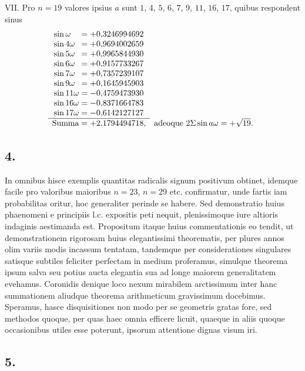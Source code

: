 \documentclass[twoside,12pt, showframe]{memoir}
\begin{document}
VII. Pro \(n=19\) valores ipsius \(a\) sunt \(1\), \(4\), \(5\), \(6\), \(7\), \(9\), \(11\), \(16\), \(17\), quibus respondent sinus
\[\begin{array}{rl}
 \sin \omega\phantom{11}=+0{,}3246994692 \phantom{,}&\\
 \sin 4 \omega\phantom{1}=+0{,}9694002659 \phantom{,}&\\
 \sin 5 \omega\phantom{1}=+0{,}9965844930 \phantom{,}&\\
\sin 6 \omega\phantom{1}=+0{,}9157733267 \phantom{,}&\\
 \sin 7 \omega\phantom{1}=+0{,}7357239107 \phantom{,}&\\
 \sin 9 \omega\phantom{1}=+0{,}1645945903 \phantom{,}&\\
 \sin 11 \omega=-0{,}4759473930 \phantom{,}&\\
 \sin 16 \omega=-0{,}8371664783 \phantom{,}&\\
 \sin 17 \omega=-0{,}6142127127 \phantom{,}&\\ 
 \cline{1-1} \text{Summa}=+2{,}1794494718,&\text{adeoque } 2 \Sigma \sin a \omega=+\sqrt{19}.
\end{array}\]\clearpage\noindent%

\subsection*{4.}
 
In omnibus hisce exemplis quantitas radicalis signum positivum obtinet, idemque facile pro valoribus maioribus \(n=23\), \(n=29\) etc. confirmatur, unde fartis iam probabilitas oritur, hoc generaliter perinde se habere. Sed demonstratio huius phaenomeni e principiis l.c. expositis peti nequit, plenissimoque iure altioris indaginis aestimanda est. Propositum itaque huius commentationis eo tendit, ut demonstrationem rigorosam huius elegantissimi theorematis, per plures annos olim variis modis incassum tentatam, tandemque per considerationes singulares satisque subtiles feliciter perfectam in medium proferamus, simulque theorema ipsum salva seu potius aucta elegantia sua ad longe maiorem generalitatem evehamus. Coronidis denique loco nexum mirabilem arctissimum inter hanc summationem aliudque theorema arithmeticum gravissimum docebimus. Speramus, hasce disquisitiones non modo per se geometris gratas fore, sed methodos quoque, per quas haec omnia efficere licuit, quaeque in aliis quoque occasionibus utiles esse poterunt, ipsorum attentione dignas visum iri.

\subsection*{5.}
 
\end{document}

